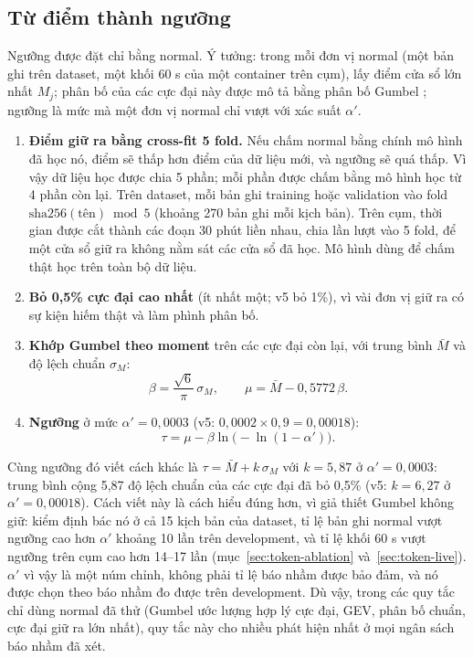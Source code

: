 \subsection{Từ điểm thành ngưỡng}

Ngưỡng được đặt chỉ bằng normal. Ý tưởng: trong mỗi đơn vị normal (một bản ghi trên dataset, một khối 60 s của một container trên cụm), lấy điểm cửa sổ lớn nhất $M_j$; phân bố của các cực đại này được mô tả bằng phân bố Gumbel \citep{coles2001}; ngưỡng là mức mà một đơn vị normal chỉ vượt với xác suất $\alpha'$.

\begin{enumerate}
\tightlist
\item
  \textbf{Điểm giữ ra bằng cross-fit 5 fold.} Nếu chấm normal bằng chính mô hình đã học nó, điểm sẽ thấp hơn điểm của dữ liệu mới, và ngưỡng sẽ quá thấp. Vì vậy dữ liệu học được chia 5 phần; mỗi phần được chấm bằng mô hình học từ 4 phần còn lại. Trên dataset, mỗi bản ghi training hoặc validation vào fold $\text{sha256}(\text{tên}) \bmod 5$ (khoảng 270 bản ghi mỗi kịch bản). Trên cụm, thời gian được cắt thành các đoạn 30 phút liền nhau, chia lần lượt vào 5 fold, để một cửa sổ giữ ra không nằm sát các cửa sổ đã học. Mô hình dùng để chấm thật học trên toàn bộ dữ liệu.
\item
  \textbf{Bỏ 0,5\% cực đại cao nhất} (ít nhất một; v5 bỏ 1\%), vì vài đơn vị giữ ra có sự kiện hiếm thật và làm phình phân bố.
\item
  \textbf{Khớp Gumbel theo moment} trên các cực đại còn lại, với trung bình $\bar M$ và độ lệch chuẩn $\sigma_M$:
  \[
  \beta = \frac{\sqrt 6}{\pi}\, \sigma_M, \qquad \mu = \bar M - 0{,}5772\, \beta.
  \]
\item
  \textbf{Ngưỡng} ở mức $\alpha' = 0{,}0003$ (v5: $0{,}0002 \times 0{,}9 = 0{,}00018$):
  \[
  \tau = \mu - \beta \ln\!\bigl(-\ln(1 - \alpha')\bigr).
  \]
\end{enumerate}

Cùng ngưỡng đó viết cách khác là $\tau = \bar M + k\,\sigma_M$ với $k = 5{,}87$ ở $\alpha' = 0{,}0003$: trung bình cộng 5,87 độ lệch chuẩn của các cực đại đã bỏ 0,5\% (v5: $k = 6{,}27$ ở $\alpha' = 0{,}00018$). Cách viết này là cách hiểu đúng hơn, vì giả thiết Gumbel không giữ: kiểm định bác nó ở cả 15 kịch bản của dataset, tỉ lệ bản ghi normal vượt ngưỡng cao hơn $\alpha'$ khoảng 10 lần trên development, và tỉ lệ khối 60 s vượt ngưỡng trên cụm cao hơn 14--17 lần (mục~\ref{sec:token-ablation} và~\ref{sec:token-live}). $\alpha'$ vì vậy là một núm chỉnh, không phải tỉ lệ báo nhầm được bảo đảm, và nó được chọn theo báo nhầm đo được trên development. Dù vậy, trong các quy tắc chỉ dùng normal đã thử (Gumbel ước lượng hợp lý cực đại, GEV, phân bố chuẩn, cực đại giữ ra lớn nhất), quy tắc này cho nhiều phát hiện nhất ở mọi ngân sách báo nhầm đã xét.

